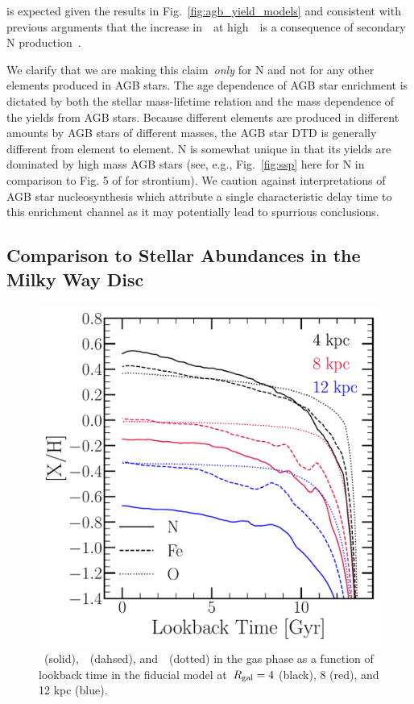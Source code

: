 \documentclass[ms.tex]{subfiles}
\begin{document}
is expected given the results in Fig.~\ref{fig:agb_yield_models} and consistent
with previous arguments that the increase in~\no~at high~\oh~is a consequence
of secondary N production~\citep{VilaCostas1993, vanZee1998, Henry1999,
PerezMontero2009, Berg2012, Pilyugin2012, Andrews2013, HaydenPawson2021}.
\par
We clarify that we are making this claim~\textit{only} for N and not for any
other elements produced in AGB stars.
The age dependence of AGB star enrichment is dictated by both the stellar
mass-lifetime relation and the mass dependence of the yields from AGB stars.
Because different elements are produced in different amounts by AGB stars of
different masses, the AGB star DTD is generally different from element to
element.
N is somewhat unique in that its yields are dominated by high mass AGB stars
(see, e.g., Fig.~\ref{fig:ssp} here for N in comparison to Fig. 5 of
\citealt{Johnson2020} for strontium).
We caution against interpretations of AGB star nucleosynthesis which attribute
a single characteristic delay time to this enrichment channel as it may
potentially lead to spurrious conclusions.


\subsection{Comparison to Stellar Abundances in the Milky Way Disc}
\label{sec:results:vincenzo_comp}

\begin{figure}
\centering
\includegraphics[scale = 0.45]{nh_feh_vs_lookback.pdf}
\caption{
\nh~(solid),~\feh~(dahsed), and~\oh~(dotted) in the gas phase as a function of
lookback time in the fiducial model at~$R_\text{gal} = 4$ (black), 8 (red), and 12 kpc
(blue).
}
\label{fig:nh_feh_vs_lookback}
\end{figure}
\end{document}
